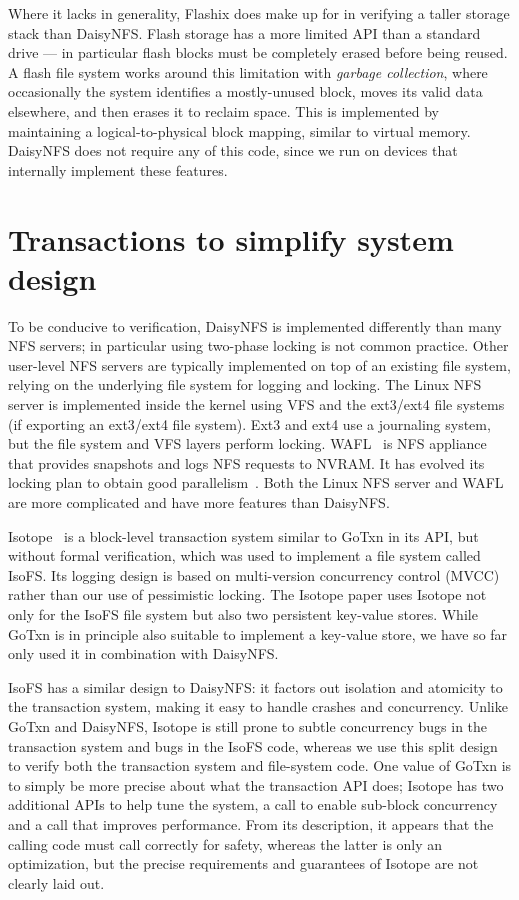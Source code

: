 Where it lacks in generality, Flashix does make up for in verifying a taller
storage stack than DaisyNFS. Flash storage has a more limited API than a
standard drive --- in particular flash blocks must be completely erased before
being reused. A flash file system works around this limitation with \emph{garbage
collection}, where occasionally the system identifies a mostly-unused block,
moves its valid data elsewhere, and then erases it to reclaim space. This is
implemented by maintaining a logical-to-physical block mapping, similar to
virtual memory. DaisyNFS does not require any of this code, since we run on
devices that internally implement these features.


\section{Transactions to simplify system design}
\label{sec:rel:txn}

To be conducive to verification, DaisyNFS is implemented differently than
many NFS servers; in particular using two-phase locking is not common
practice.  Other user-level NFS servers are typically implemented on
top of an existing file system, relying on the underlying file system
for logging and locking. The Linux NFS server is implemented inside
the kernel using VFS and the ext3/ext4 file systems (if exporting an
ext3/ext4 file system).  Ext3 and ext4 use a journaling system, but
the file system and VFS layers perform locking.  WAFL~\cite{wafl:hitz}
is NFS appliance that provides snapshots and logs NFS requests to
NVRAM.  It has evolved its locking plan to obtain good
parallelism~\cite{curtis:wafl}.  Both the Linux NFS server and WAFL
are more complicated and have more features than DaisyNFS.

Isotope~\cite{shin:isotope} is a block-level transaction system similar to GoTxn
in its API, but without formal verification, which was used to implement a file
system called IsoFS. Its logging design is based on
multi-version concurrency control (MVCC) rather than our use of pessimistic
locking. The Isotope paper uses Isotope not only for the IsoFS file system but
also two persistent key-value stores. While GoTxn is in principle also suitable to implement a
key-value store, we have so far only used it in combination with DaisyNFS.\@

IsoFS has a similar design to DaisyNFS: it factors out isolation and atomicity to the transaction
system, making it easy to handle crashes and concurrency. Unlike GoTxn and
DaisyNFS, Isotope is still prone to subtle concurrency bugs in the transaction
system and bugs in the IsoFS code, whereas we use this split design to verify
both the transaction system and file-system code. One value of GoTxn is to
simply be more precise about what the transaction API does; Isotope has two
additional APIs to help tune the system, a  call to enable
sub-block concurrency and a  call that improves performance.
From its description, it appears
that the calling code must call  correctly for safety,
whereas the latter is only an optimization, but the precise requirements and
guarantees of Isotope are not clearly laid out.
